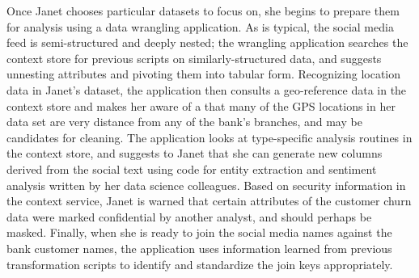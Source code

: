 \documentclass{sig-alternate}
\begin{document}
Once Janet chooses particular datasets to focus on, she begins to prepare them for analysis using a data wrangling application. As is typical, the social media feed is semi-structured and deeply nested; the wrangling application searches the context store for previous scripts on similarly-structured data, and suggests unnesting attributes and pivoting them into tabular form.  Recognizing location data in Janet's dataset, the application then consults a geo-reference data in the context store and makes her aware of a that many of the GPS locations in her data set are very distance from any of the bank's branches, and may be candidates for cleaning. The application looks at type-specific analysis routines in the context store, and suggests to Janet that she can generate new columns derived from the social text using code for entity extraction and sentiment analysis written by her data science colleagues. Based on security information in the context service, Janet is warned that certain attributes of the customer churn data were marked confidential by another analyst, and should perhaps be masked. Finally, when she is ready to join the social media names against the bank customer names, the application uses information learned from previous transformation scripts to identify and standardize the join keys appropriately. 
\end{document}
